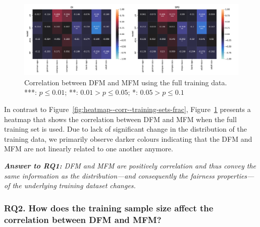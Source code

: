 \documentclass{article}
\newcommand{\highlight}[1]{\begin{framed}%
  \noindent\emph{#1}
\end{framed}}
\begin{document}
\begin{figure}
  \centering
  \includegraphics[width=0.95\linewidth]{heatmap--corr--full-data.pdf}
  \caption{Correlation between DFM and MFM using the full training
  data. ***: $p \le 0.01$; **: $0.01 > p \le0.05$; *: $0.05 > p \le
  0.1$}
  \label{fig:heatmap--corr--full-data}
\end{figure}

In contrast to Figure \ref{fig:heatmap--corr--training-sets-frac},
Figure \ref{fig:heatmap--corr--full-data} presents a heatmap that
shows the correlation between DFM and MFM when the full training set
is used. Due to lack of significant change in the distribution of the
training data, we primarily observe darker colours indicating that the
DFM and MFM are not linearly related to one another anymore.

\highlight{\textbf{Answer to RQ1:} DFM and MFM are positively
correlation and thus convey the same information as the
distribution---and consequently the fairness properties---of the
underlying training dataset changes.}

\subsubsection{RQ2. How does the training sample size affect the
correlation between DFM and MFM?}\label{sec:results-corr-frac}
\end{document}
